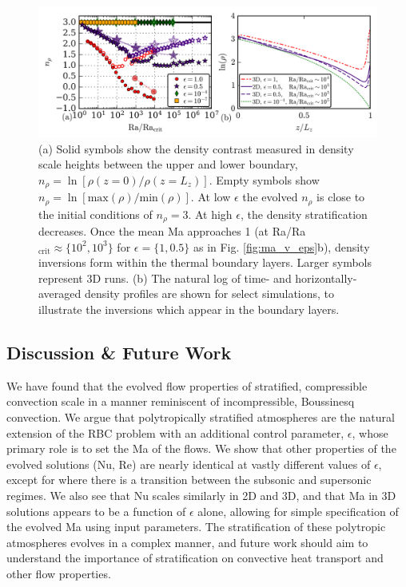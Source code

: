 \begin{figure}[t!]
\includegraphics[width=\textwidth]{./figs/density_v_ra.pdf}
\caption[Stratification: density vs.~height at different Mach numbers]
{
	\label{fig:nrho_v_ra} 
	(a) Solid symbols show the density contrast measured in density scale heights between the upper and lower boundary, $n_\rho = \ln[\rho(z=0)/\rho(z=L_z)]$.
	Empty symbols show $n_\rho = \ln[\text{max}(\rho)/\text{min}(\rho)]$. 
	At low $\epsilon$ the evolved $n_{\rho}$ is close to the initial conditions of $n_\rho = 3$.  
	At high $\epsilon$, the density stratification decreases.  
	Once the mean Ma approaches 1 (at Ra/Ra$_{\text{crit}} \approx \{10^2, 10^3\}$ for $\epsilon = \{1, 0.5\}$ as in Fig. \ref{fig:ma_v_eps}b), density inversions form within the thermal boundary layers. 
	Larger symbols represent 3D runs. 
	(b) The natural log of time- and horizontally-averaged density profiles are shown for select simulations, to illustrate the inversions which appear in the boundary layers.
}
\end{figure}

\subsection{Discussion \& Future Work}
We have found that the evolved flow properties of stratified, compressible convection scale in a manner reminiscent of incompressible, Boussinesq \RB convection.
We argue that polytropically stratified atmospheres are the natural extension of the RBC problem with an additional control parameter, $\epsilon$, whose primary role is to set the Ma of the flows.  
We show that other properties of the evolved solutions (Nu, Re) are nearly identical at vastly different values of $\epsilon$, except for where there is a transition between the subsonic and supersonic regimes.  
We also see that Nu scales similarly in 2D and 3D, and that Ma in 3D solutions appears to be a function of $\epsilon$ alone, allowing for simple specification of the evolved Ma using input parameters.
The stratification of these polytropic atmospheres evolves in a complex manner, and future work should aim to understand the importance of stratification on convective heat transport and other flow properties.

